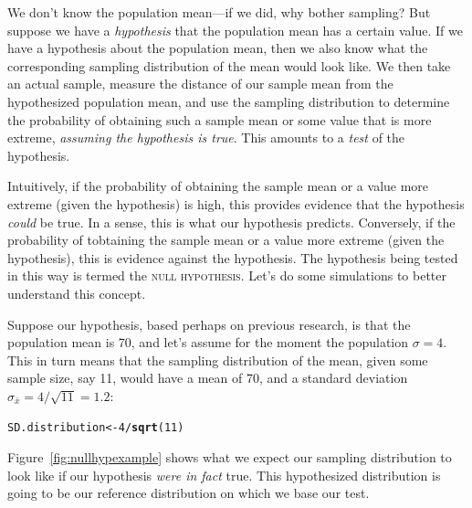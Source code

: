 \documentclass[12pt]{book}\usepackage[]{graphicx}\usepackage[]{color}
\makeatletter
\newcommand{\hlnum}[1]{\textcolor[rgb]{0.686,0.059,0.569}{#1}}%
\newcommand{\hlopt}[1]{\textcolor[rgb]{0,0,0}{#1}}%
\newcommand{\hlstd}[1]{\textcolor[rgb]{0.345,0.345,0.345}{#1}}%
\newcommand{\hlkwb}[1]{\textcolor[rgb]{0.69,0.353,0.396}{#1}}%
\newcommand{\hlkwd}[1]{\textcolor[rgb]{0.737,0.353,0.396}{\textbf{#1}}}%
\newenvironment{kframe}{%
 \def\at@end@of@kframe{}%
 \ifinner\ifhmode%
  \def\at@end@of@kframe{\end{minipage}}%
  \begin{minipage}{\columnwidth}%
 \fi\fi%
 \def\FrameCommand##1{\hskip\@totalleftmargin \hskip-\fboxsep
 \colorbox{shadecolor}{##1}\hskip-\fboxsep
     \hskip-\linewidth \hskip-\@totalleftmargin \hskip\columnwidth}%
 \MakeFramed {\advance\hsize-\width
   \@totalleftmargin\z@ \linewidth\hsize
   \@setminipage}}%
 {\par\unskip\endMakeFramed%
 \at@end@of@kframe}
\newenvironment{knitrout}{}{} %
\makeatother
\begin{document}
We don't know the population mean---if we did, why bother sampling?
But suppose we have a \textit{hypothesis} that the population mean
has a certain value.  If we have a hypothesis about the
population mean, 
then we also know what the corresponding sampling distribution  of the mean would look like.
We then take an actual sample, measure the distance of our sample mean
from the hypothesized population mean, and use the
sampling distribution to determine the probability of obtaining 
such a sample mean or some value that is more extreme, 
\textit{assuming the hypothesis
is true}. This amounts to a \emph{test} of the hypothesis. 

Intuitively, if the probability of obtaining the sample mean or a value more extreme (given the hypothesis) is high, this provides evidence that the hypothesis \textit{could} be true. In a sense, this is what our hypothesis predicts. Conversely, if the probability of tobtaining the sample mean or a value more extreme (given the hypothesis), this is evidence against the hypothesis. 
The hypothesis being tested in this way is termed the \textsc{null hypothesis}. Let's do some simulations to
better understand this concept.

Suppose our hypothesis, based perhaps on previous research, 
is that the population mean is 70, and let's assume for the moment the population $\sigma = 4$. This in turn means that the sampling distribution of the mean, given some sample size, say 11, would have a mean of 70, and a standard deviation $\sigma_{\bar{x}} = 4/\sqrt{11} = 1.2$:

\begin{knitrout}
\color{fgcolor}\begin{kframe}
\begin{alltt}
\hlstd{SD.distribution} \hlkwb{<-} \hlnum{4}\hlopt{/}\hlkwd{sqrt}\hlstd{(}\hlnum{11}\hlstd{)}
\end{alltt}
\end{kframe}
\end{knitrout}

Figure~\ref{fig:nullhypexample} shows what we expect our sampling
distribution to look like if our hypothesis \textit{were in fact}
true. This hypothesized distribution is going to be our reference
distribution on which we base our test.
\end{document}
